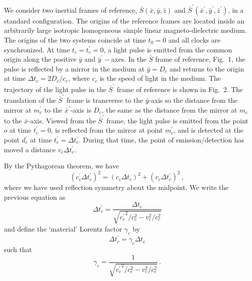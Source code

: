 \documentclass[twocolumn,amssymb,eqsecnum,aps,pra]{revtex4-2}
\begin{document}
We consider two inertial frames of reference,
$\bar S(\bar x,\bar y,\bar z)$ and
$\bar S^{\prime} (\bar x^{\prime},\bar y^{\prime},\bar z^{\prime})$,
in a standard configuration.
The origins of the reference frames are located inside an
arbitrarily large isotropic homogeneous simple linear
magneto-dielectric medium.
The origins of the two systems coincide at time $t_0=0$ and
all clocks are synchronized.
At time $t_c=t_c^{\prime}=0$, a light pulse is emitted from the common
origin along the positive $\bar y$ and $\bar y^{\prime}-$axes.
In the $\bar S$ frame of reference, Fig.~1, the pulse is reflected by
a mirror in the medium at $\bar y=D_c$ and returns to the origin at
time $\Delta t_c=2D_c/c_c$, where $c_c$ is the speed of light in the
medium.
The trajectory of the light pulse in the $\bar S^{\prime}$ frame of 
reference is shown in Fig.~2.
The translation of the $\bar S^{\prime}$ frame is transverse to the
$\bar y$-axis so the distance from the mirror at $m_c^{\prime}$ to the
$\bar x^{\prime}$-axis is $D_c$, the same as the distance from the
mirror at $m_c$ to the $\bar x$-axis.
Viewed from the $\bar S^{\prime}$ frame, the light pulse is emitted from
the point $o$ at time $t_c^{\prime}=0$, is reflected from the mirror at
point $m_c^{\prime}$, and is detected at the point $d_c^{\prime}$ at
time $t_c^{\prime} =\Delta t_c^{\prime}$.
During that time, the point of emission/detection has moved a
distance $v_c\Delta t_c^{\prime}$.
\par
By the Pythagorean theorem, we have
\begin{equation}
(c_c^{\prime}\Delta t_c^{\prime})^2
=(c_c\Delta t_c)^2+(v_c\Delta t_c^{\prime})^2 \, ,
\label{EQq6.03}
\end{equation}
where we have used reflection symmetry about the midpoint.
We write the previous equation as \cite{BIAJP}
\begin{equation}
\Delta t_c^{\prime}=
\frac{\Delta t_c}{\sqrt{{c_c^{\prime}}^2/c_c^2-v_c^2/c_c^2}}
\label{EQq6.04}
\end{equation}
and define the `material' Lorentz factor $\gamma_c$ by
\begin{equation}
\Delta t_c^{\prime}= \gamma_c \Delta t_c
\label{EQq6.05}
\end{equation}
such that
\begin{equation}
\gamma_c= \frac {1}{\sqrt{{c_c^{\prime}}^2/c_c^2-v_c^2/c_c^2}} \,.
\label{EQq6.06}
\end{equation}
\end{document}

